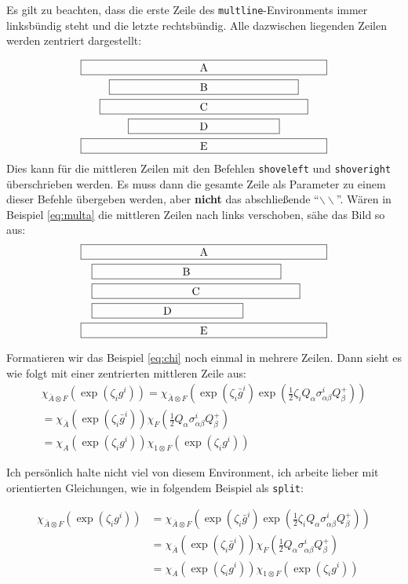 Es gilt zu beachten, dass die erste Zeile des \texttt{multline}-Environments immer linksbündig steht und die letzte rechtsbündig. Alle dazwischen liegenden Zeilen werden zentriert dargestellt:

\begin{multline}\label{eq:multa}
\framebox[.65\columnwidth]{A}\\
\framebox[.5\columnwidth]{B}\\
\framebox[.55\columnwidth]{C}\\
\framebox[.4\columnwidth]{D}\\
\framebox[.65\columnwidth]{E}
\end{multline}
Dies kann für die mittleren Zeilen mit den Befehlen \texttt{shoveleft} und \texttt{shoveright} überschrieben werden. Es muss dann die gesamte Zeile als Parameter zu einem dieser Befehle übergeben werden, aber \textbf{nicht} das abschließende "`$\backslash\backslash$"'. Wären in Beispiel \ref{eq:multa} die mittleren Zeilen nach links verschoben, sähe das Bild so aus:
\begin{multline}\label{eq:multb}
\framebox[.65\columnwidth]{A}\\
\shoveleft{\framebox[.5\columnwidth]{B}}\\
\shoveleft{\framebox[.55\columnwidth]{C}}\\
\shoveleft{\framebox[.4\columnwidth]{D}}\\
\framebox[.65\columnwidth]{E}
\end{multline}

Formatieren wir das Beispiel \ref{eq:chi} noch einmal in mehrere Zeilen. Dann sieht es wie folgt mit einer zentrierten mittleren Zeile aus:
\begin{multline}
\chi_{\bar{A}\otimes F}(\exp(\zeta_i g^i)) = \chi_{\bar{A}\otimes F}\left( \exp(\zeta_i \bar{g}^i) \exp(\frac{1}{2} \zeta_i Q_\alpha \sigma^i_{\alpha \beta} Q^+_\beta)\right) \\
= \chi_{\bar{A}}\left( \exp(\zeta_i \bar{g}^i) \right) \chi_F \left( \frac{1}{2} Q_\alpha \sigma^i_{\alpha \beta} Q^+_\beta \right) \\
= \chi_A \left( \exp (\zeta_i g^i) \right) \chi_{1\otimes F} \left( \exp(\zeta_i g^i) \right)
\end{multline}

Ich persönlich halte nicht viel von diesem Environment, ich arbeite lieber mit orientierten Gleichungen, wie in folgendem Beispiel als \texttt{split}:

\begin{equation}
\begin{split}
\chi_{\bar{A}\otimes F}(\exp(\zeta_i g^i)) &= \chi_{\bar{A}\otimes F}\left( \exp(\zeta_i \bar{g}^i) \exp(\frac{1}{2} \zeta_i Q_\alpha \sigma^i_{\alpha \beta} Q^+_\beta)\right) \\
&= \chi_{\bar{A}}\left( \exp(\zeta_i \bar{g}^i) \right) \chi_F \left( \frac{1}{2} Q_\alpha \sigma^i_{\alpha \beta} Q^+_\beta \right) \\
&= \chi_A \left( \exp (\zeta_i g^i) \right) \chi_{1\otimes F} \left( \exp(\zeta_i g^i) \right)
\end{split}
\end{equation}


